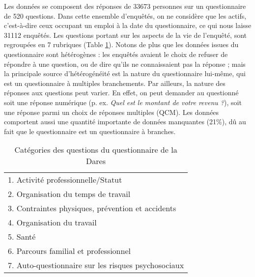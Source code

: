 \documentclass[11pt,fleqn,openany,frenchb]{book} %
\begin{document}
Les données se composent des réponses de 33673 personnes sur un questionnaire de 520 questions. Dans cette ensemble d'enquêtés, on ne considère que les actifs, c'est-à-dire ceux occupant un emploi à la date du questionnaire, ce qui nous laisse 31112 enquêtés. Les questions portant sur les aspects de la vie de l'enquêté, sont regroupées en 7 rubriques (Table \ref{tab:cat_questions}). Notons de plus que les données issues du questionnaire sont hétérogènes : les enquêtés avaient le choix de refuser de répondre à une question, ou de dire qu'ils ne connaissaient pas la réponse ; mais la principale source d'hétérogénéité est la nature du questionnaire lui-même, qui est un questionnaire à multiples branchements. Par ailleurs, la nature des réponses aux questions peut varier. En effet, on peut demander au questionné soit une réponse numérique (p. ex. \textit{Quel est le montant de votre revenu ?}), soit une réponse parmi un choix de réponses multiples (QCM). Les données comportent aussi une quantité importante de données manquantes (21\%), dû au fait que le questionnaire est un questionnaire à branches.\par

\begin{table}[!h]
\centering
\begin{tabular}{|l|}
\hline
1. Activité professionnelle/Statut\\
2. Organisation du temps de travail \\
3. Contraintes physiques, prévention et accidents \\
4. Organisation du travail \\
5. Santé \\
6. Parcours familial et professionnel\\
7. Auto-questionnaire sur les risques psychosociaux\\
\hline
\end{tabular}%
\caption{Catégories des questions du questionnaire de la Dares}
\label{tab:cat_questions}
\end{table}
\end{document}
